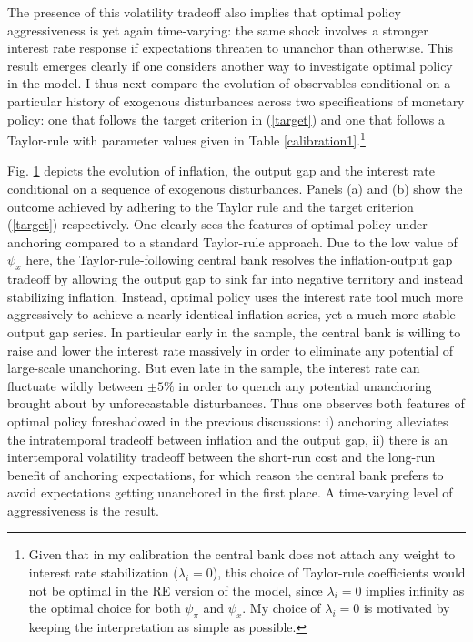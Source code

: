 \documentclass[11pt]{article}
\def \myFigPath {../../figures/}
\renewcommand{\[}{\begin{equation}}
\renewcommand{\]}{\end{equation}}
\def\fignamePEAobsTR{implement_anchTC_obs_TR}
\def\fignamePEAobsAnch{implement_anchTC_obs}
\begin{document}
The presence of this volatility tradeoff also implies that optimal policy aggressiveness is yet again time-varying: the same shock involves a stronger interest rate response if expectations threaten to unanchor than otherwise. This result emerges clearly if one considers another way to investigate optimal policy in the model. I thus next compare the evolution of observables conditional on a particular history of exogenous disturbances across two specifications of monetary policy: one that follows the target criterion in (\ref{target}) and one that follows a Taylor-rule with parameter values given in Table \ref{calibration1}.\footnote{Given that in my calibration the central bank does not attach any weight to interest rate stabilization ($\lambda_i=0$), this choice of Taylor-rule coefficients would not be optimal in the RE version of the model, since $\lambda_i=0$ implies infinity as the optimal choice for both $\psi_{\pi}$ and $\psi_x$. My choice of $\lambda_i=0$ is motivated by keeping the interpretation as simple as possible.}

\begin{figure}[h!]
\hfill %
\caption{}
\label{pea_TCvsTR}
\end{figure}



Fig. \ref{pea_TCvsTR} depicts the evolution of inflation, the output gap and the interest rate conditional on a sequence of exogenous disturbances. Panels (a) and (b) show the outcome achieved by adhering to the Taylor rule and the target criterion (\ref{target}) respectively. One clearly sees the features of optimal policy under anchoring compared to a standard Taylor-rule approach. Due to the low value of $\psi_x$ here, the Taylor-rule-following central bank resolves the inflation-output gap tradeoff by allowing the output gap to sink far into negative territory and instead stabilizing inflation. Instead, optimal policy uses the interest rate tool much more aggressively to achieve a nearly identical inflation series, yet a much more stable output gap series. In particular early in the sample, the central bank is willing to raise and lower the interest rate massively in order to eliminate any potential of large-scale unanchoring. But even late in the sample, the interest rate can fluctuate wildly between $\pm5\%$ in order to quench any potential unanchoring brought about by unforecastable disturbances. Thus one observes both features of optimal policy foreshadowed in the previous discussions: i) anchoring alleviates the intratemporal tradeoff between inflation and the output gap, ii) there is an intertemporal volatility tradeoff between the short-run cost and the long-run benefit of anchoring expectations, for which reason the central bank prefers to avoid expectations getting unanchored in the first place. A time-varying level of aggressiveness is the result.
\end{document}
